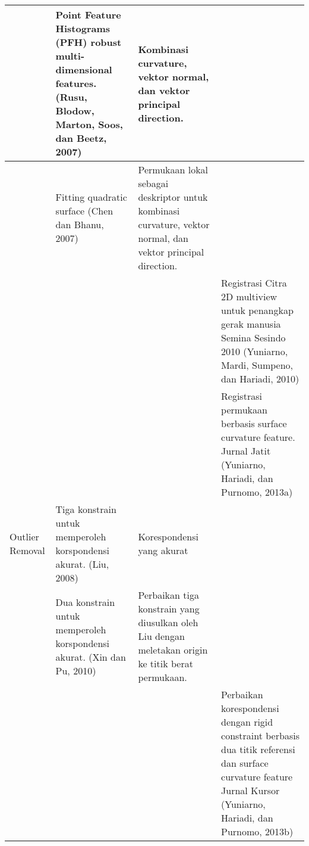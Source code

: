 \documentclass{article}
\begin{document}
\begin{longtable}{|p{3cm}| p{7cm} | p{7cm} | p{7cm}|}
		& Point Feature Histograms (PFH) robust multi-dimensional features. (Rusu, Blodow, Marton, Soos, dan Beetz, 2007) & Kombinasi curvature, vektor normal, dan vektor principal direction. & \\ \hline 
		& Fitting quadratic surface (Chen dan Bhanu, 2007) & Permukaan lokal sebagai deskriptor untuk kombinasi curvature, vektor normal, dan vektor principal direction. & \\ \hline 
		& & & Registrasi Citra 2D multiview untuk penangkap gerak manusia Semina Sesindo 2010 (Yuniarno, Mardi, Sumpeno, dan Hariadi, 2010) \\ \hline 
		& & & Registrasi permukaan berbasis surface curvature feature. Jurnal Jatit (Yuniarno, Hariadi, dan Purnomo, 2013a) \\ \hline 
		Outlier Removal & Tiga konstrain untuk memperoleh korspondensi akurat. (Liu, 2008) & Korespondensi yang akurat & \\ \hline 
		& Dua konstrain untuk memperoleh korspondensi akurat. (Xin dan Pu, 2010) & Perbaikan tiga konstrain yang diusulkan oleh Liu dengan meletakan origin ke titik berat permukaan. & \\ \hline 
		& & & Perbaikan korespondensi dengan rigid constraint berbasis dua titik referensi dan surface curvature feature Jurnal Kursor (Yuniarno, Hariadi, dan Purnomo, 2013b) \cite{Brathwaite2009} \\ \hline 
	\end{longtable}
	
\end{document}
